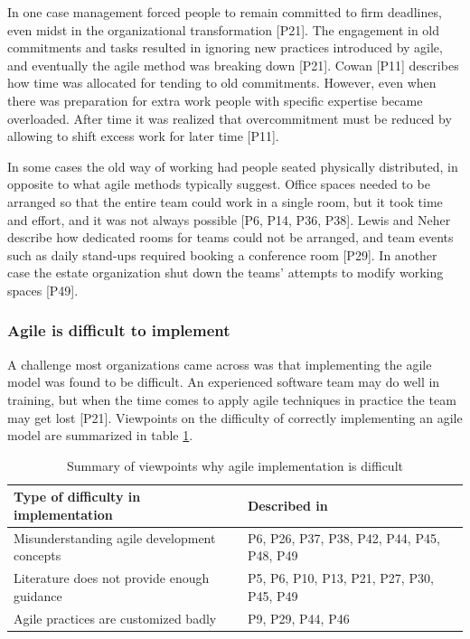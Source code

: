 \documentclass[preprint,authoryear,12pt]{elsarticle}
\begin{document}
In one case management forced people to remain committed to firm deadlines, even
midst in the organizational transformation [P21]. The engagement in old
commitments and tasks resulted in ignoring new practices introduced by agile,
and eventually the agile method was breaking down [P21].
Cowan [P11] describes how time was allocated for tending to old commitments.
However, even when there was preparation for extra work people with specific
expertise became overloaded. After time it was realized that overcommitment must
be reduced by allowing to shift excess work for later time [P11].



In some cases the old way of working had people seated physically distributed,
in opposite to what agile methods typically suggest. Office spaces needed to be
arranged so that the entire team could work in a single room, but it took time
and effort, and it was not always possible [P6, P14, P36, P38]. Lewis and Neher
describe how dedicated rooms for teams could not be arranged, and team events
such as daily stand-ups required booking a conference room [P29]. In another
case the estate organization shut down the teams' attempts to modify working
spaces [P49].


\subsubsection{Agile is difficult to implement}

A challenge most organizations came across was that implementing the agile model
was found to be difficult. An experienced software team may do well in training,
but when the time comes to apply agile techniques in practice the team may get
lost [P21]. Viewpoints on the difficulty of correctly implementing an agile
model are summarized in table \ref{table:challenges_difficulty}.


\begin{table}
    \centering
    \begin{tabular}{ >{\raggedright\arraybackslash}p{}
                     >{\raggedright\arraybackslash}p{} }
        \toprule
        Type of difficulty in implementation  &  Described in \\
        \midrule
        Misunderstanding agile development concepts  &
                P6, P26, P37, P38, P42, P44, P45, P48, P49      \\
        Literature does not provide enough guidance  &
                P5, P6, P10, P13, P21, P27, P30, P45, P49     \\
        Agile practices are customized badly   &
                P9, P29, P44, P46  \\
        \bottomrule
    \end{tabular}
    \caption{Summary of viewpoints why agile implementation is difficult}
    \label{table:challenges_difficulty}
\end{table}
\end{document}
